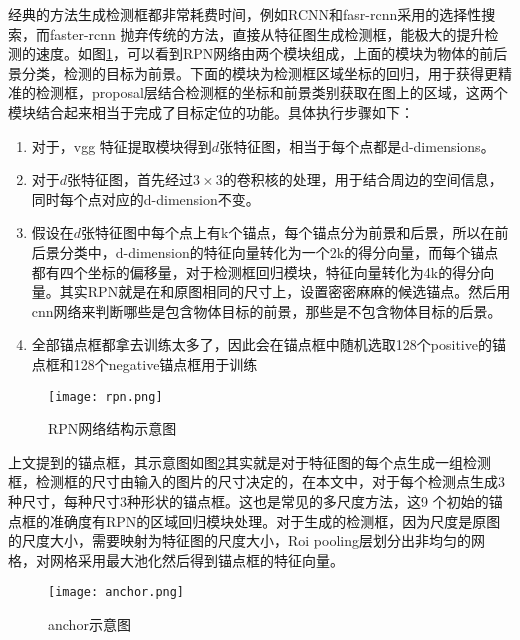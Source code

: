 经典的方法生成检测框都非常耗费时间，例如RCNN和fasr-rcnn采用的选择性搜索，而faster-rcnn 抛弃传统的方法，直接从特征图生成检测框，能极大的提升检测的速度。如图\ref{fig:rpn}，可以看到RPN网络由两个模块组成，上面的模块为物体的前后景分类，检测的目标为前景。下面的模块为检测框区域坐标的回归，用于获得更精准的检测框，proposal层结合检测框的坐标和前景类别获取在图上的区域，这两个模块结合起来相当于完成了目标定位的功能。具体执行步骤如下：
\begin{enumerate}
    \item 对于，vgg 特征提取模块得到$d$张特征图，相当于每个点都是d-dimensions。
    \item 对于$d$张特征图，首先经过$3 \times 3$的卷积核的处理，用于结合周边的空间信息，同时每个点对应的d-dimension不变。
    \item 假设在$d$张特征图中每个点上有k个锚点，每个锚点分为前景和后景，所以在前后景分类中，d-dimension的特征向量转化为一个2k的得分向量，而每个锚点都有四个坐标的偏移量，对于检测框回归模块，特征向量转化为4k的得分向量。其实RPN就是在和原图相同的尺寸上，设置密密麻麻的候选锚点。然后用cnn网络来判断哪些是包含物体目标的前景，那些是不包含物体目标的后景。
    \item 全部锚点框都拿去训练太多了，因此会在锚点框中随机选取128个positive的锚点框和128个negative锚点框用于训练
\end{enumerate}
\begin{figure}[htpb]
	\centering
	\texttt{[image: rpn.png]}
    \caption{RPN网络结构示意图}
	\vspace*{-3.5mm}
	\label{fig:rpn}
\end{figure}
上文提到的锚点框，其示意图如图\ref{fig:anchor}其实就是对于特征图的每个点生成一组检测框，检测框的尺寸由输入的图片的尺寸决定的，在本文中，对于每个检测点生成3种尺寸，每种尺寸3种形状的锚点框。这也是常见的多尺度方法，这9 个初始的锚点框的准确度有RPN的区域回归模块处理。对于生成的检测框，因为尺度是原图的尺度大小，需要映射为特征图的尺度大小，Roi pooling层划分出非均匀的网格，对网格采用最大池化然后得到锚点框的特征向量。
\begin{figure}[htpb]
	\centering
	\texttt{[image: anchor.png]}
    \caption{anchor示意图}
	\vspace*{-3.5mm}
	\label{fig:anchor}
\end{figure}


